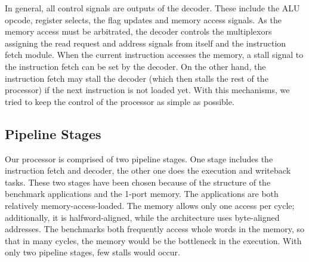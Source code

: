 In general, all control signals are outputs of the decoder. These include the ALU opcode, register selects, the flag updates and memory access signals. As the memory access must be arbitrated, the decoder controls the multiplexors assigning the read request and address signals from itself and the instruction fetch module. When the current instruction accesses the memory, a stall signal to the instruction fetch can be set by the decoder. On the other hand, the instruction fetch may stall the decoder (which then stalls the rest of the processor) if the next instruction is not loaded yet. With this mechanisms, we tried to keep the control of the processor as simple as possible.

\subsection{Pipeline Stages}
\label{subsec:pipelinestages}

Our processor is comprised of two pipeline stages. One stage includes the instruction fetch and decoder, the other one does the execution and writeback tasks. These two stages have been chosen because of the structure of the benchmark applications and the 1-port memory. The applications are both relatively memory-access-loaded. The memory allows only one access per cycle; additionally, it is halfword-aligned, while the architecture uses byte-aligned addresses. The benchmarks both frequently access whole words in the memory, so that in many cycles, the memory would be the bottleneck in the execution. With only two pipeline stages, few stalls would occur. 



